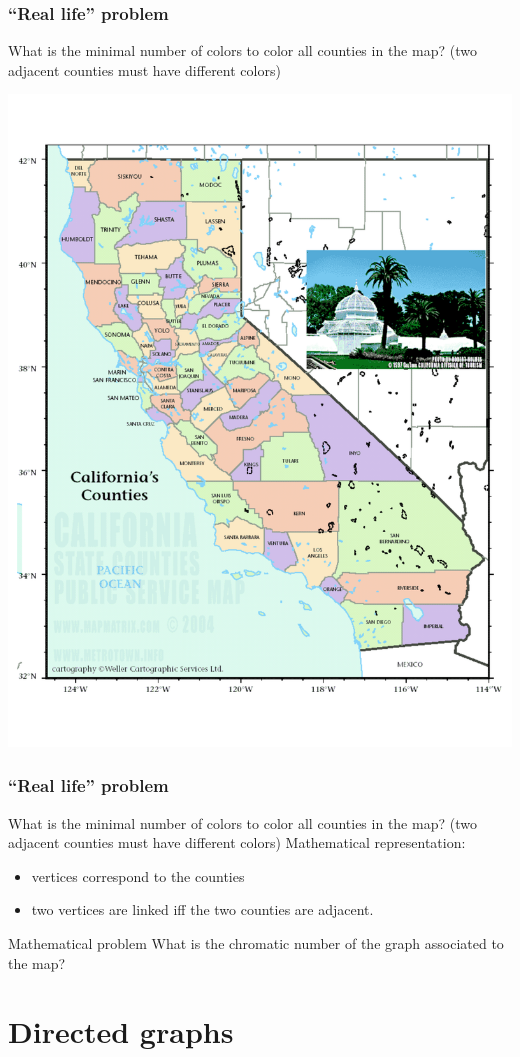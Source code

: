 \documentclass[aspectratio=169]{beamer}
\begin{document}
\begin{frame}\frametitle{``Real life'' problem}
What is the minimal number of colors to color all counties in the map?
(two adjacent counties must have different colors)
\begin{center}
\includegraphics[width=.5\textwidth]{FIGS_slides/california}
\end{center}\end{frame}

\begin{frame}\frametitle{``Real life'' problem}
What is the minimal number of colors to color all counties in the map?
(two adjacent counties must have different colors)
Mathematical representation:
\begin{itemize}
\item vertices correspond to the counties
\item two vertices are linked iff the two counties are adjacent.
\end{itemize}
\begin{block}{Mathematical problem}
What is the chromatic number of the graph associated to the map?
\end{block}
\end{frame}




\section{Directed graphs}
\end{document}
